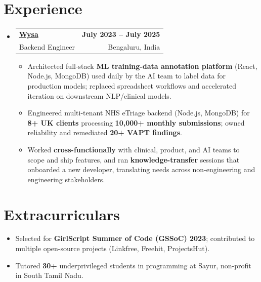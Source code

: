 \documentclass[letterpaper,10pt]{article}
\makeatletter
\newcommand{\resumeItem}[1]{
  \item\small{#1\vspace{-1pt}}
}
\newcommand{\resumeSubheading}[4]{
  \vspace{1pt}\item
    \begin{tabular*}{0.985\textwidth}[t]{l@{\extracolsep{\fill}}r}
      \textbf{#1} & \textbf{\small #2} \\
      {\small\color{ResumeSlate} #3} & {\small\color{ResumeSlate} #4} \\
    \end{tabular*}\vspace{-6pt}
}
\newcommand{\resumeSubHeadingListStart}{\begin{itemize}[leftmargin=0.0in, label={}, itemsep=2pt, topsep=2pt]}
\newcommand{\resumeSubHeadingListEnd}{\end{itemize}}
\newcommand{\resumeItemListStart}{\begin{itemize}[leftmargin=0.18in, itemsep=2pt, topsep=1pt]}
\newcommand{\resumeItemListEnd}{\end{itemize}\vspace{-4pt}}
\makeatother
\begin{document}
\section{Experience}
\resumeSubHeadingListStart
  \resumeSubheading
    {\href{https://www.wysa.io}{Wysa}}{July 2023 -- July 2025}
    {Backend Engineer}{Bengaluru, India}
    \resumeItemListStart
      \resumeItem{Architected full-stack \textbf{ML training-data annotation platform} (React, Node.js, MongoDB) used daily by the AI team to label data for production models; replaced spreadsheet workflows and accelerated iteration on downstream NLP/clinical models.}
      \resumeItem{Engineered multi-tenant NHS eTriage backend (Node.js, MongoDB) for \textbf{8+ UK clients} processing \textbf{10{,}000+ monthly submissions}; owned reliability and remediated \textbf{20+ VAPT findings}.}
      \resumeItem{Worked \textbf{cross-functionally} with clinical, product, and AI teams to scope and ship features, and ran \textbf{knowledge-transfer} sessions that onboarded a new developer, translating needs across non-engineering and engineering stakeholders.}
    \resumeItemListEnd
\resumeSubHeadingListEnd
\vspace{-4pt}
\section{Extracurriculars}
\begin{itemize}[leftmargin=0.18in, itemsep=0pt, topsep=1pt]
  \item\small Selected for \textbf{GirlScript Summer of Code (GSSoC) 2023}; contributed to multiple open-source projects (Linkfree, Freehit, ProjectsHut).
  \item\small Tutored \textbf{30+} underprivileged students in programming at Sayur, non-profit in South Tamil Nadu.
\end{itemize}
\vspace{-6pt}
\end{document}
